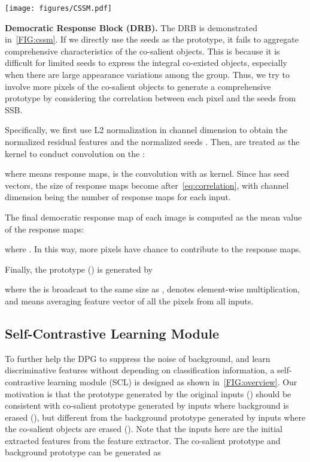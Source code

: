 \documentclass[10pt,twocolumn,letterpaper]{article}
\begin{document}
\begin{figure*}
	\centering
	\texttt{[image: figures/CSSM.pdf]}
	\caption{The framework of the seed selection block (SSB) and democratic response block (DRB). The inputs are the residual features. Then, the co-salient seeds are selected first from the residual features by SSB. After that, the response maps are produced using the selected seeds and the residual features through DRB. The final response maps and the input residual features are fused to generate the prototype.
	}
	\label{FIG:cssm}
\end{figure*}

\textbf{Democratic Response Block (DRB).} The DRB is demonstrated in~\cref{FIG:cssm}. If we directly use the seeds  as the prototype, it fails to aggregate comprehensive characteristics of the co-salient objects. This is because it is difficult for limited seeds to express the integral co-existed objects, especially when there are large appearance variations among the group. Thus, we try to involve more pixels of the co-salient objects to generate a comprehensive prototype by considering the correlation between each pixel and the seeds  from SSB.

Specifically, we first use L2 normalization in channel dimension to obtain the normalized residual features  and the normalized seeds . Then,  are treated as the kernel to conduct convolution on the : 

where  means response maps,  is the convolution with  as kernel. Since  has  seed vectors, the size of response maps become  after~\cref{eq:correlation}, with channel dimension being the number of response maps for each input. 

The final democratic response map of each image is computed as the mean value of the  response maps:

where . In this way, more pixels have chance to contribute to the response maps.

Finally, the prototype () is generated by

where the  is broadcast to the same size as ,  denotes element-wise multiplication, and  means averaging feature vector of all the pixels from all inputs.

\subsection{Self-Contrastive Learning Module}
To further help the DPG to suppress the noise of background, and learn discriminative features without depending on classification information, a self-contrastive learning module (SCL) is designed as shown in~\cref{FIG:overview}. Our motivation is that the prototype generated by the original inputs () should be consistent with co-salient prototype generated by inputs where background is erased (), but different from the background prototype generated by inputs where the co-salient objects are erased (). Note that the inputs here are the initial extracted features  from the feature extractor. The co-salient prototype and background prototype can be generated as
\end{document}
